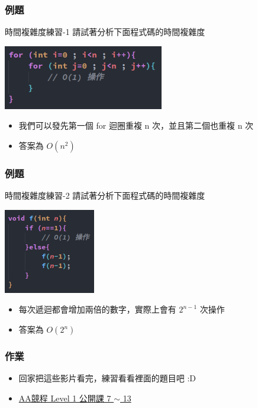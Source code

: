 \documentclass{beamer}
\begin{document}
\begin{frame}
    \frametitle{例題}
    \begin{block}{時間複雜度練習-1}
        請試著分析下面程式碼的時間複雜度

        \vspace{0.5cm}
        \includegraphics[width=7.0cm]{img/code_1.png}
    \end{block}
    \begin{itemize}
        \item<2-> 我們可以發先第一個 for 迴圈重複 n 次，並且第二個也重複 n 次
        \item<2-> 答案為 $O(n^2)$
    \end{itemize}
\end{frame}

\begin{frame}
    \frametitle{例題}
    \begin{block}{時間複雜度練習-2}
        請試著分析下面程式碼的時間複雜度

        \vspace{0.5cm}
        \includegraphics[width=4.0cm]{img/code_2.png}
    \end{block}
    \begin{itemize}
        \item<2-> 每次遞迴都會增加兩倍的數字，實際上會有 $2^{n-1}$ 次操作
        \item<2-> 答案為 $O(2^n)$
    \end{itemize}
\end{frame}

\begin{frame}
    \frametitle{作業}
    \begin{itemize}
        \item 回家把這些影片看完，練習看看裡面的題目吧 :D
        \item \href{https://youtube.com/playlist?list=PLuV4P3EY8fXl-2qmLTZVWS3deHyxxWLUI}{AA競程 Level 1 公開課 7 $\sim$ 13}
    \end{itemize}
\end{frame}
\end{document}
